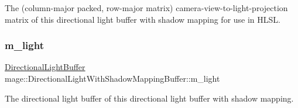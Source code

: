 The (column-\/major packed, row-\/major matrix) camera-\/view-\/to-\/light-\/projection matrix of this directional light buffer with shadow mapping for use in H\+L\+SL. \hypertarget{structmage_1_1_directional_light_with_shadow_mapping_buffer_a911c958b0e442c927f6e8f8f73d9dbe1}{}\label{structmage_1_1_directional_light_with_shadow_mapping_buffer_a911c958b0e442c927f6e8f8f73d9dbe1} 
\subsubsection{\texorpdfstring{m\+\_\+light}{m\_light}}
{\footnotesize\ttfamily \hyperlink{structmage_1_1_directional_light_buffer}{Directional\+Light\+Buffer} mage\+::\+Directional\+Light\+With\+Shadow\+Mapping\+Buffer\+::m\+\_\+light}

The directional light buffer of this directional light buffer with shadow mapping. 